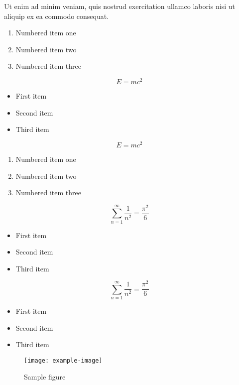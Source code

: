 \documentclass{article}
\begin{document}
Ut enim ad minim veniam, quis nostrud exercitation ullamco laboris nisi ut aliquip ex ea commodo consequat.

\begin{enumerate}
\item Numbered item one
\item Numbered item two
\item Numbered item three
\end{enumerate}

\begin{equation}
    E = mc^2
\end{equation}

\begin{itemize}
\item First item
\item Second item
\item Third item
\end{itemize}

\begin{equation}
    E = mc^2
\end{equation}


\begin{enumerate}
\item Numbered item one
\item Numbered item two
\item Numbered item three
\end{enumerate}

\begin{equation}
    \sum_{n=1}^{\infty} \frac{1}{n^2} = \frac{\pi^2}{6}
\end{equation}

\begin{itemize}
\item First item
\item Second item
\item Third item
\end{itemize}

\begin{equation}
    \sum_{n=1}^{\infty} \frac{1}{n^2} = \frac{\pi^2}{6}
\end{equation}

\begin{itemize}
\item First item
\item Second item
\item Third item
\end{itemize}

\begin{figure}[h]
    \centering
    \texttt{[image: example-image]}
    \caption{Sample figure}
    \label{fig:sample}
\end{figure}
\end{document}
